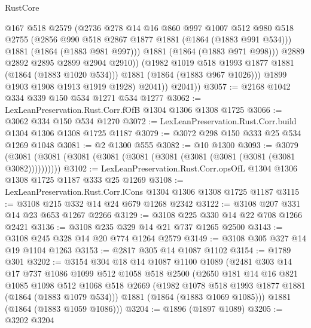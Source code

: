 \begin{lexlean}{RustCore}
\begin{coremodule}
                      @167
                      @518
                      @2579
                      (@2736
                        @278
                        @14
                        @16
                        @860
                        @997
                        @1007
                        @512
                        @980
                        @518
                        @2755
                        (@2856 @990 @518 @2867 @1877 @1881 (@1864 (@1883 @991 @534)))
                        @1881
                        (@1864 (@1883 @981 @997)))
                      @1881
                      (@1864 (@1883 @971 @998)))
                    @2889
                    @2892
                    @2895
                    @2899
                    @2904
                    @2910))
                (@1982 @1019 @518 @1993 @1877 @1881 (@1864 (@1883 @1020 @534)))
                @1881
                (@1864 (@1883 @967 @1026)))
              @1899
              @1903
              @1908
              @1913
              @1919
              @1928)
            @2041))
        @2041))
@3057 := @2168 @1042 @334 @339 @150 @534 @1271 @534 @1277
@3062 := LexLeanPreservation.Rust.Corr.fOfB @1304 @1306 @1308 @1725
@3066 := @3062 @334 @150 @534 @1270
@3072 := LexLeanPreservation.Rust.Corr.build @1304 @1306 @1308 @1725 @1187
@3079 := @3072 @298 @150 @333 @25 @534 @1269 @1048
@3081 := @2 @1300 @555
@3082 := @10 @1300
@3093 := @3079 (@3081 (@3081 (@3081 (@3081 (@3081 (@3081 (@3081 (@3081 (@3081 (@3081 @3082))))))))))
@3102 := LexLeanPreservation.Rust.Corr.opsOfL @1304 @1306 @1308 @1725 @1187 @333 @25 @1269
@3108 := LexLeanPreservation.Rust.Corr.lCons @1304 @1306 @1308 @1725 @1187
@3115 := @3108 @215 @332 @14 @24 @679 @1268 @2342
@3122 := @3108 @207 @331 @14 @23 @653 @1267 @2266
@3129 := @3108 @225 @330 @14 @22 @708 @1266 @2421
@3136 := @3108 @235 @329 @14 @21 @737 @1265 @2500
@3143 := @3108 @245 @328 @14 @20 @774 @1264 @2579
@3149 := @3108 @305 @327 @14 @19 @1104 @1263
@3153 := @2817 @305 @14 @1087 @1102
@3154 := @1789 @301
@3202 := @3154
    @304
    @18
    @14
    @1087
    @1100
    @1089
    (@2481
      @303
      @14
      @17
      @737
      @1086
      @1099
      @512
      @1058
      @518
      @2500
      (@2650
        @181
        @14
        @16
        @821
        @1085
        @1098
        @512
        @1068
        @518
        @2669
        (@1982 @1078 @518 @1993 @1877 @1881 (@1864 (@1883 @1079 @534)))
        @1881
        (@1864 (@1883 @1069 @1085)))
      @1881
      (@1864 (@1883 @1059 @1086)))
@3204 := @1896 (@1897 @1089)
@3205 := @3202 @3204

\end{coremodule}
\end{lexlean}
